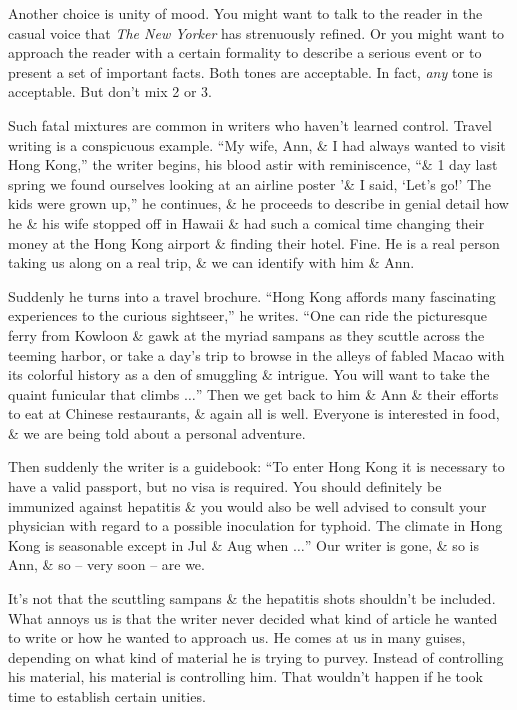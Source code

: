 \documentclass{article}
\begin{document}
Another choice is unity of mood. You might want to talk to the reader in the casual voice that \textit{The New Yorker} has strenuously refined. Or you might want to approach the reader with a certain formality to describe a serious event or to present a set of important facts. Both tones are acceptable. In fact, \textit{any} tone is acceptable. But don't mix 2 or 3.

Such fatal mixtures are common in writers who haven't learned control. Travel writing is a conspicuous example. ``My wife, Ann, \& I had always wanted to visit Hong Kong,'' the writer begins, his blood astir with reminiscence, ``\& 1 day last spring we found ourselves looking at an airline poster '\& I said, `Let's go!' The kids were grown up,'' he continues, \& he proceeds to describe in genial detail how he \& his wife stopped off in Hawaii \& had such a comical time changing their money at the Hong Kong airport \& finding their hotel. Fine. He is a real person taking us along on a real trip, \& we can identify with him \& Ann.

Suddenly he turns into a travel brochure. ``Hong Kong affords many fascinating experiences to the curious sightseer,'' he writes. ``One can ride the picturesque ferry from Kowloon \& gawk at the myriad sampans as they scuttle across the teeming harbor, or take a day's trip to browse in the alleys of fabled Macao with its colorful history as a den of smuggling \& intrigue. You will want to take the quaint funicular that climbs $\ldots$'' Then we get back to him \& Ann \& their efforts to eat at Chinese restaurants, \& again all is well. Everyone is interested in food, \& we are being told about a personal adventure.

Then suddenly the writer is a guidebook: ``To enter Hong Kong it is necessary to have a valid passport, but no visa is required. You should definitely be immunized against hepatitis \& you would also be well advised to consult your physician with regard to a possible inoculation for typhoid. The climate in Hong Kong is seasonable except in Jul \& Aug when $\ldots$'' Our writer is gone, \& so is Ann, \& so -- very soon -- are we.

It's not that the scuttling sampans \& the hepatitis shots shouldn't be included. What annoys us is that the writer never decided what kind of article he wanted to write or how he wanted to approach us. He comes at us in many guises, depending on what kind of material he is trying to purvey. Instead of controlling his material, his material is controlling him. That wouldn't happen if he took time to establish certain unities.
\end{document}
